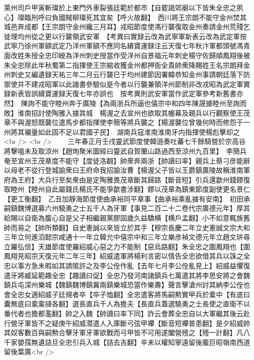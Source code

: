 萊州司戶甲寅斬璨於上東門外車裂張廷範於都市【自罷謁郊廟以下皆朱全忠之夙心】璨臨刑呼曰負國賊柳璨死其宜矣【呼火故翻】　西川將王宗朗不能守金州焚其城邑奔成都【王宗朗守金州纔三月耳】戎昭節度使馮行襲復取金州奏請金州荒殘乞徙理均州從之更以行襲領武安軍　【考異曰實録云改為武寧軍新表云改為武定軍按武寧乃徐州軍額武定乃洋州軍額不應同名續寶運録注云天復七年秋汴軍都頭號馮青面改姓朱授全忠印綬為洋州刺史授當作受洋州自景福元年刺史楊守佐歸順鳳翔後被朱全忠除此年秋蜀第二指揮使王宗綰收獲金州都押衙全貴帥衆降賜姓王名宗朗拜金州刺史又編遺録天祐三年二月云行襲巳于均州建節因署韓恭知金州事請朝廷落下防禦使并不建戎昭軍以此諸書參驗似是今者以行襲兼領洋州節制非改戎昭為武定軍實録新表皆誤續寶運録天復七年亦誤也　按考異則武安軍當作武定軍參考新舊書亦然】　陳詢不能守睦州奔于廣陵【為兩浙兵所逼也僖宗中和四年陳晟據睦州至詢而敗】淮南招討使陶雅入據其城　楊渥之去宣州也欲取其幄幕及親兵以行觀察使王茂章不與渥怒既襲位遣馬步都指揮使李簡等將兵襲之【楊渥襲位曾幾何時而修怨于一州將其褊量如此固不足以君國子民】　湖南兵寇淮南淮南牙内指揮使楊彪擊却之<br />
<br />
　　三年春正月壬戌靈武節度使韓遜奏吐蕃七千餘騎營於宗高谷將擊嗢未及取涼州【趙珣聚米圖經曰靈武自賀蘭山路過西至涼州九百里】　李簡兵奄至宣州王茂章度不能守【度徒洛翻】帥衆奔兩浙【帥讀曰率】親兵上蔡刁彦能辭以母老不從行登城諭衆曰王府命我招諭汝曹【楊渥父子皆以王爵鎮廣陵故稱淮南軍府為王府】大兵行至矣衆由是定陶雅畏茂章斷其歸路【斷音短】引兵還歙州錢鏐復取睦州【睦州自此屬錢氏楊氏不能爭歙書涉翻】鏐以茂章為鎮東節度副使更名景仁【更工衡翻】　乙丑加靜海節度使曲承裕同平章事【曲承裕乘亂據有安南】　初田承嗣鎮魏博選募六州驍勇之士五千人為牙軍【事見二百二十二卷代宗廣德元年】厚其給賜以自衛為腹心自是父子相繼親黨膠固歲久益驕横【横戶孟翻】小不如意輒族舊帥而易之【帥所類翻】自史憲誠以來皆立於其手【穆宗長慶二年立史憲誠文宗大和三年立何進滔懿宗咸通十一年立韓允中僖宗中和三年立樂彦禎文德元年立趙文㺹尋立羅弘信】天雄節度使羅紹威心惡之力不能制【惡烏路翻】朱全忠之圍鳳翔也【圍鳳翔見昭宗天復元年二年三年】紹威遣軍將楊利言密以情告全忠欲借其兵以誅之全忠以事方急未暇如其請隂許之及李公佺作亂【去年七月李公佺亂見上】紹威益懼復遣牙將臧延範趣全忠【趣讀曰促】全忠乃發河南諸鎮兵七萬遣其將李思安將之會魏鎮兵屯深州樂城【魏鎮魏博鎮冀兩鎮樂城恐當作樂夀】聲言擊滄州討其納李公佺也會全忠女適紹威子廷規者卒【卒子恤翻】全忠遣客將馬嗣勲實甲兵於槖中【有底曰囊無底曰槖槖撻各翻】選長直兵千人為擔夫【長直兵蓋選驍勇之士長使之直衛不以番代者也擔都濫翻】帥之入魏【帥讀曰率下同】詐云會葬全忠自以大軍繼其後云赴行營牙軍皆不之疑庚午紹威潜遣人入庫斷弓弦甲襻【斷音短襻普患翻】是夕紹威帥其奴客數百與嗣勲合擊牙軍牙軍欲戰而弓甲皆不可用遂闔營殪之【殪一計翻】凡八千家嬰孺無遺詰旦全忠引兵入城【詰去吉翻】辛未以權知寧遠留後龎巨昭嶺南西道留後葉廣<br />
